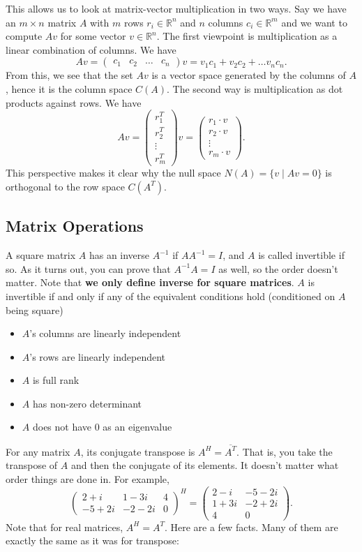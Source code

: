 \documentclass[11pt]{article}
\theoremstyle{plain} %
\theoremstyle{definition}
\theoremstyle{remark}
\begin{document}
This allows us to look at matrix-vector multiplication in two ways. Say we have an $m \times n$ matrix $A$ with $m$ rows $r_i \in \mathbb{R}^n$ and $n$ columns $c_i \in \mathbb{R}^m$ and we want to compute $Av$ for some vector $v\in \mathbb{R}^n$. The first viewpoint is multiplication as a linear combination of columns. We have $$Av = \begin{pmatrix}c_1 & c_2 & \ldots & c_n\end{pmatrix}v = v_1 c_1 + v_2 c_2 + \ldots v_n c_n.$$ From this, we see that the set $Av$ is a vector space generated by the columns of $A$, hence it is the column space $C(A)$. The second way is multiplication as dot products against rows. We have $$Av =\begin{pmatrix}r_1^T\\r_2^T\\\vdots\\r_m^T\end{pmatrix}v =\begin{pmatrix}r_1\cdot v\\r_2 \cdot v\\\vdots \\ r_m \cdot v\end{pmatrix}.$$ This perspective makes it clear why the null space $N(A) = \{v \mid Av = 0\}$ is orthogonal to the row space $C(A^T)$.

\subsection{Matrix Operations}

A square matrix $A$ has an inverse $A^{-1}$ if $AA^{-1} = I$, and $A$ is called invertible if so. As it turns out, you can prove that $A^{-1}A = I$ as well, so the order doesn't matter. Note that \textbf{we only define inverse for square matrices}. $A$ is invertible if and only if any of the equivalent conditions hold (conditioned on $A$ being square)
\begin{itemize}
\item $A$'s columns are linearly independent
\item $A$'s rows are linearly independent
\item $A$ is full rank
\item $A$ has non-zero determinant
\item $A$ does not have $0$ as an eigenvalue
\end{itemize}

For any matrix $A$, its conjugate transpose is $A^H = \overline{A^T}$. That is, you take the transpose of $A$ and then the conjugate of its elements. It doesn't matter what order things are done in. For example, $$\begin{pmatrix}2 + i & 1 - 3i & 4\\-5 + 2i & -2 - 2i & 0\end{pmatrix}^H = \begin{pmatrix}2-i & -5-2i\\1+3i&-2+2i\\4&0\end{pmatrix}.$$
Note that for real matrices, $A^H = A^T$. Here are a few facts. Many of them are exactly the same as it was for transpose:
\end{document}
